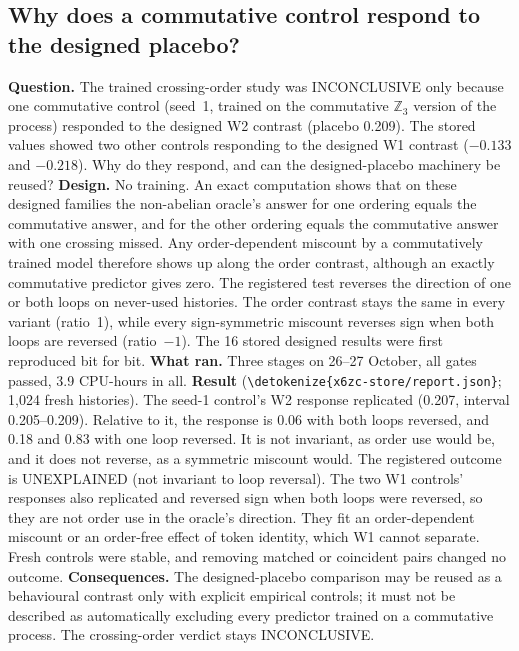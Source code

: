 \documentclass[11pt,a4paper]{article}
\DeclareRobustCommand{\_}{\ifmmode\origunderscore\else\textunderscore\allowbreak\fi}
\DeclareRobustCommand{\fpath}[1]{\begingroup\small\expandafter\nolinkurl\expandafter{\detokenize{#1}}\endgroup}
\begin{document}
\subsection{Why does a commutative control respond to the designed placebo?}\label{sec:x6zc}
\textbf{Question.} The trained crossing-order study was INCONCLUSIVE only because one commutative
control (seed~1, trained on the commutative $\mathbb{Z}_3$ version of the process) responded to
the designed W2 contrast (placebo 0.209). The stored values showed two other controls responding
to the designed W1 contrast ($-0.133$ and $-0.218$). Why do they respond, and can the
designed-placebo machinery be reused?
\textbf{Design.} No training. An exact computation shows that on these designed families the
non-abelian oracle's answer for one ordering equals the commutative answer, and for the other
ordering equals the commutative answer with one crossing missed. Any order-dependent miscount by
a commutatively trained model therefore shows up along the order contrast, although an exactly
commutative predictor gives zero. The registered test reverses the direction of one or both
loops on never-used histories. The order contrast stays the same in every variant (ratio~1),
while every sign-symmetric miscount reverses sign when both loops are reversed (ratio~$-1$).
The 16 stored designed results were first reproduced bit for bit.
\textbf{What ran.} Three stages on 26--27 October, all gates passed, 3.9 CPU-hours in all.
\textbf{Result} (\fpath{x6zc-store/report.json}; 1,024 fresh histories). The seed-1 control's
W2 response replicated (0.207, interval 0.205--0.209). Relative to it, the response is 0.06 with
both loops reversed, and 0.18 and 0.83 with one loop reversed. It is not invariant, as order use
would be, and it does not reverse, as a symmetric miscount would. The registered outcome is
UNEXPLAINED (not invariant to loop reversal). The two W1 controls' responses also replicated and
reversed sign when both loops were reversed, so they are not order use in the oracle's
direction. They fit an order-dependent miscount or an order-free effect of token identity, which
W1 cannot separate. Fresh controls were stable, and removing matched or coincident pairs changed
no outcome.
\textbf{Consequences.} The designed-placebo comparison may be reused as a behavioural contrast
only with explicit empirical controls; it must not be described as automatically excluding every
predictor trained on a commutative process. The crossing-order verdict stays INCONCLUSIVE.


\end{document}
